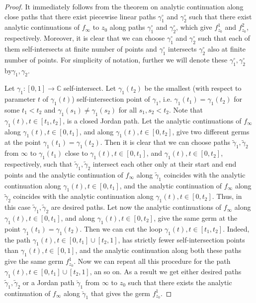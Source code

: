 \documentclass[10pt,a4paper]{amsart}
\def\CC{\mathbb C}
\let\myt\widetilde
\let\myt\widetilde
\begin{document}
\begin{proof}
It immediately follows from the theorem on analytic continuation along close paths that there exist piecewise linear paths $\gamma^\circ_1$ and $\gamma^\circ_2$ such that
there exist analytic continuations of $f_\infty$ to $z_0$ along paths $\gamma^\circ_1$ and $\gamma^\circ_2$, which give $f_{z_0}^1$ and $f_{z_0}^2$, respectively.
Moreover, it is clear that we can choose $\gamma^\circ_1$ and $\gamma^\circ_2$  such that each of them self-intersects at finite number of points and $\gamma^\circ_1$ intersects $\gamma^\circ_2$ also at finite number of points. For simplicity of notation, further we will denote these $\gamma^\circ_1, \gamma^\circ_2$ by$\gamma_1, \gamma_2$.

Let $\gamma_1: [0,1]\to\CC$ self-intersect. Let $\gamma_1(t_2)$ be the smallest (with respect to parameter $t$ of $\gamma_1(t)$) self-intersection point of $\gamma_1$, i.e. $\gamma_1(t_1) = \gamma_1(t_2)$ for some $t_1<t_2$ and $\gamma_1(s_1) \ne \gamma_1(s_2)$ for all $s_1,s_2<t_2$.
Note that $\gamma_1(t), t\in[t_1,t_2]$, is a closed Jordan path.
Let the analytic continuations of $f_\infty$ along $\gamma_1(t), t\in[0,t_1]$, and along $\gamma_1(t), t\in[0,t_2]$, give two different germs at the point $\gamma_1(t_1)=\gamma_1(t_2)$. Then it is clear that we can choose paths $\myt\gamma_1, \myt\gamma_2$  from $\infty$ to $\gamma_1(t_1)$ close to $\gamma_1(t), t\in[0,t_1]$, and $\gamma_1(t), t\in[0,t_2]$, respectively, such that $\myt\gamma_1, \myt\gamma_2$ intersect each other only at their start and end points and the analytic continuation of $f_\infty$ along $\myt\gamma_1$ coincides with the analytic continuation along $\gamma_1(t), t\in[0,t_1]$, and the analytic continuation of $f_\infty$ along $\myt\gamma_2$ coincides with the analytic continuation along $\gamma_1(t), t\in[0,t_2]$. Thus, in this case $\myt\gamma_1, \myt\gamma_2$ are desired paths.
Let now the analytic continuations of $f_\infty$ along $\gamma_1(t), t\in[0,t_1]$, and along $\gamma_1(t), t\in[0,t_2]$, give the same germ at the point $\gamma_1(t_1)=\gamma_1(t_2)$. Then we can cut the loop $\gamma_1(t), t\in[t_1, t_2]$. Indeed, the path $\gamma_1(t), t\in[0,t_1]\cup [t_2,1]$, has strictly fewer self-intersection points than $\gamma_1(t), t\in[0,1]$, and the analytic continuation along both these paths give the same germ $f_{z_0}^1$. Now we can repeat all this procedure for the path $\gamma_1(t), t\in[0,t_1]\cup [t_2,1]$, an so on. As a result we get either desired paths $\myt\gamma_1, \myt\gamma_2$ or a Jordan path $\breve\gamma_1$ from $\infty$ to $z_0$ such that there exists the analytic continuation of $f_\infty$ along $\breve\gamma_1$ that gives the germ $f_{z_0}^1$.


\end{proof}
\end{document}
